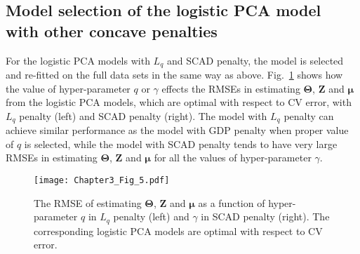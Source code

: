 \subsection{Model selection of the logistic PCA model with other concave penalties}
For the logistic PCA models with $L_{q}$ and SCAD penalty, the model is selected and re-fitted on the full data sets in the same way as above. Fig.~\ref{chapter3_fig:5} shows how the value of hyper-parameter $q$ or $\gamma$ effects the RMSEs in estimating $\mathbf{\Theta}$, $\mathbf{Z}$ and $\bm{\mu}$ from the logistic PCA models, which are optimal with respect to CV error, with $L_{q}$ penalty (left) and SCAD penalty (right). The model with $L_{q}$ penalty can achieve similar performance as the model with GDP penalty when proper value of $q$ is selected, while the model with SCAD penalty tends to have very large RMSEs in estimating $\mathbf{\Theta}$, $\mathbf{Z}$ and $\bm{\mu}$ for all the values of hyper-parameter $\gamma$.

\begin{figure}[htbp]
    \centering
    \texttt{[image: Chapter3\_Fig\_5.pdf]}
    \caption{The RMSE of estimating $\mathbf{\Theta}$, $\mathbf{Z}$ and $\bm{\mu}$ as a function of hyper-parameter $q$ in $L_{q}$ penalty (left) and $\gamma$ in SCAD penalty (right). The corresponding logistic PCA models are optimal with respect to CV error.}
    \label{chapter3_fig:5}
\end{figure}

